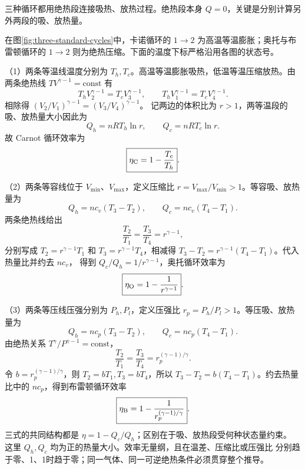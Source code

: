 \begin{xesolution}
三种循环都用绝热段连接吸热、放热过程。绝热段本身 $Q=0$，关键是分别计算另外两段的吸、放热量。

在图\ref{fig:three-standard-cycles}中，卡诺循环的 $1\to2$ 为高温等温膨胀；奥托与布雷顿循环的
$1\to2$ 则为绝热压缩。下面的温度下标严格沿用各图的状态号。

（1）两条等温线温度分别为 $T_h,T_c$。高温等温膨胀吸热，低温等温压缩放热。由两条绝热线
$TV^{\gamma-1}=\mathrm{const}$ 有
\[
 T_hV_2^{\gamma-1}=T_cV_3^{\gamma-1},\qquad
 T_hV_1^{\gamma-1}=T_cV_4^{\gamma-1}.
\]
相除得 $(V_2/V_1)^{\gamma-1}=(V_3/V_4)^{\gamma-1}$。
记两边的体积比为 $r>1$，两等温段的吸、放热量大小因此为
\begin{equation*}
  Q_h=nRT_h\ln r,\qquad Q_c=nRT_c\ln r.
\end{equation*}
故 Carnot 循环效率为
\begin{equation}
  \boxed{\eta_{\rm C}=1-\frac{T_c}{T_h}}.
\end{equation}

（2）两条等容线位于 $V_{\min}$、$V_{\max}$，定义压缩比
$r=V_{\max}/V_{\min}>1$。等容吸、放热量为
\begin{equation*}
  Q_h=n c_v(T_3-T_2),\qquad Q_c=n c_v(T_4-T_1).
\end{equation*}
两条绝热线给出
\begin{equation*}
  \frac{T_2}{T_1}=\frac{T_3}{T_4}=r^{\gamma-1},
\end{equation*}
分别写成 $T_2=r^{\gamma-1}T_1$ 和 $T_3=r^{\gamma-1}T_4$，相减得
$T_3-T_2=r^{\gamma-1}(T_4-T_1)$。代入热量比并约去 $nc_v$，
得到 $Q_c/Q_h=1/r^{\gamma-1}$，奥托循环效率为
\begin{equation}
  \boxed{\eta_{\rm O}=1-\frac{1}{r^{\gamma-1}}}.
\end{equation}

（3）两条等压线压强分别为 $P_h,P_l$，定义压强比 $r_p=P_h/P_l>1$。等压吸、放热量为
\begin{equation*}
  Q_h=n c_p(T_3-T_2),\qquad Q_c=n c_p(T_4-T_1).
\end{equation*}
由绝热关系 $T^\gamma/P^{\gamma-1}=\mathrm{const}$，
\begin{equation*}
  \frac{T_2}{T_1}=\frac{T_3}{T_4}=r_p^{(\gamma-1)/\gamma}.
\end{equation*}
令 $b=r_p^{(\gamma-1)/\gamma}$，则 $T_2=bT_1,T_3=bT_4$，所以
$T_3-T_2=b(T_4-T_1)$。约去热量比中的 $nc_p$，得到布雷顿循环效率
\begin{equation}
  \boxed{\eta_{\rm B}=1-\frac{1}{r_p^{(\gamma-1)/\gamma}}}.
\end{equation}
三式的共同结构都是 $\eta=1-Q_c/Q_h$；区别在于吸、放热段受何种状态量约束。
这里 $Q_h,Q_c$ 均为正的热量大小。效率无量纲，且在温差、压缩比或压强比
分别趋于零、1、1时趋于零；同一气体、同一可逆绝热条件必须贯穿整个推导。
\end{xesolution}

